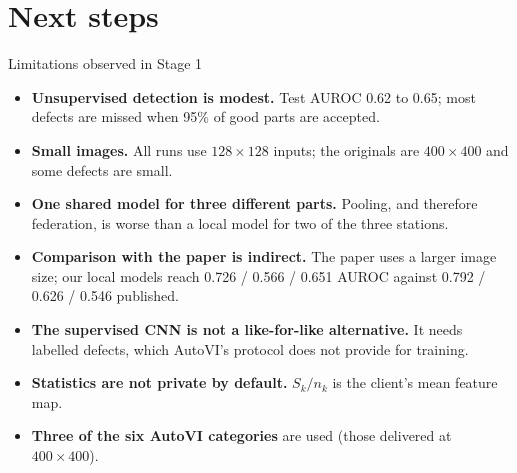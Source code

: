 \documentclass[aspectratio=169,10pt]{beamer}
\begin{document}
\section{Next steps}

\begin{frame}{Limitations observed in Stage 1}
  \begin{itemize}
    \item \textbf{Unsupervised detection is modest.} Test AUROC 0.62 to 0.65; most
          defects are missed when 95\% of good parts are accepted.
    \item \textbf{Small images.} All runs use $128\times128$ inputs; the originals are
          $400\times400$ and some defects are small.
    \item \textbf{One shared model for three different parts.} Pooling, and therefore
          federation, is worse than a local model for two of the three stations.
    \item \textbf{Comparison with the paper is indirect.} The paper uses a larger
          image size; our local models reach 0.726 / 0.566 / 0.651 AUROC against
          0.792 / 0.626 / 0.546 published.
    \item \textbf{The supervised CNN is not a like-for-like alternative.} It needs
          labelled defects, which AutoVI's protocol does not provide for training.
    \item \textbf{Statistics are not private by default.} $S_k/n_k$ is the
          client's mean feature map.
    \item \textbf{Three of the six AutoVI categories} are used (those delivered at
          $400\times400$).
  \end{itemize}
\end{frame}
\end{document}
